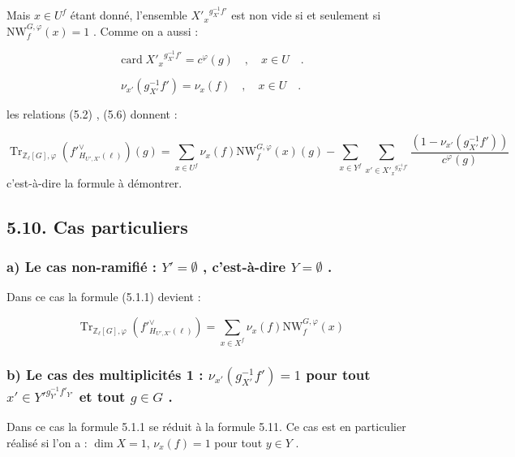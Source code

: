 \documentclass[11pt]{article}
\providecommand{\Tr}{\operatorname{Tr}}
\providecommand{\Tr}{\operatorname{Tr}}
\providecommand{\Tr}{\operatorname{Tr}}
\providecommand{\Tr}{\operatorname{Tr}}
\providecommand{\bZ}{\mathbb Z}
\providecommand{\card}{\operatorname{card}}
\providecommand{\Tr}{\operatorname{Tr}}
\begin{document}
Mais $x \in U^f$ étant donné, l'ensemble ${X'_x}^{g_{X'}^{-1}f'}$ est non vide si et seulement si $\mathrm{NW}_{f}^{G,\varphi}(x) = 1$ . Comme on a aussi :

\begin{equation}\tag{5.7}
\card {X'_x}^{g_{X'}^{-1}f'} = c^\varphi(g) \quad , \quad x \in U \quad .
\end{equation}

\begin{equation}\tag{5.8}
\nu_{x'}(g_{X'}^{-1}f') = \nu_x(f) \quad , \quad x \in U \quad .
\end{equation}

les relations (5.2) , (5.6) donnent :

\begin{equation}\tag{5.9}
\Tr_{\bZ_\ell[G],\varphi}(f'^\vee_{H_{U',X'}(\ell)})(g) = \sum_{x \in U^f} \nu_x(f) \mathrm{NW}_f^{G,\varphi}(x)(g) - \sum_{x \in Y^f} \sum_{x' \in {X'_x}^{g_{X'}^{-1}f'}} \frac{(1 - \nu_{x'}(g_{X'}^{-1}f'))}{c^\varphi(g)}
\end{equation}
c'est-à-dire la formule à démontrer.

\subsection*{5.10. Cas particuliers}
\subsubsection*{a) Le cas non-ramifié : $Y' = \emptyset$ , c'est-à-dire $Y = \emptyset$ .}

Dans ce cas la formule (5.1.1) devient :

\begin{equation}\tag{5.11}
\Tr_{\bZ_\ell[G],\varphi}(f'^\vee_{H_{U',X'}(\ell)}) = \sum_{x \in X^f} \nu_x(f) \mathrm{NW}_f^{G,\varphi}(x)
\end{equation}

\subsubsection*{b) Le cas des multiplicités 1 : $\nu_{x'}(g_{X'}^{-1}f') = 1$ pour tout $x'\in {Y'}^{g_{Y'}^{-1}f'_{Y'}}$ et tout $g\in G$ .}

Dans ce cas la formule 5.1.1 se réduit à la formule 5.11. Ce cas est en particulier réalisé si l'on a : $\dim X = 1$, $\nu_x(f)=1$ pour tout $y\in Y$ .%
\end{document}
